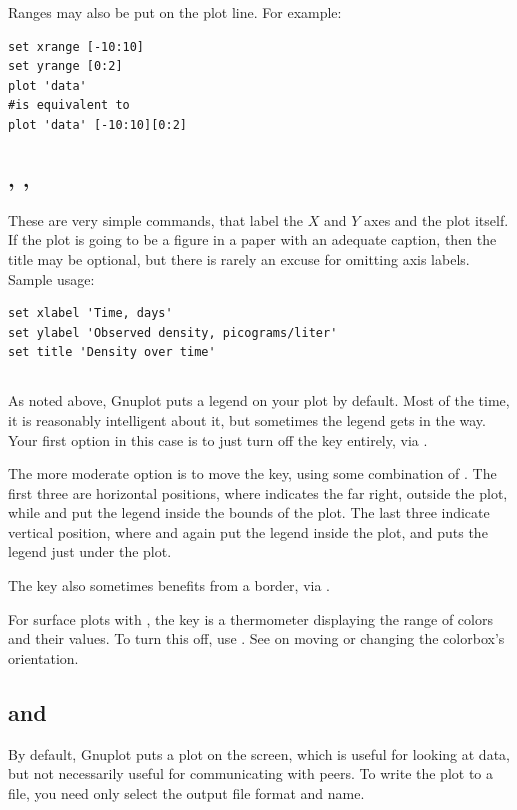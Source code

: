 Ranges may also be put on the plot line. For example:
\begin{lstlisting}
set xrange [-10:10]
set yrange [0:2]
plot 'data'
#is equivalent to
plot 'data' [-10:10][0:2]
\end{lstlisting}

\subsection{, , }
These are
very simple commands, that label the $X$
and $Y$ axes and the plot itself. If the plot is going to be a figure
in a paper with an adequate caption, then the title may be optional, but
there is rarely an excuse for omitting axis labels. Sample usage:
\begin{lstlisting}
set xlabel 'Time, days'
set ylabel 'Observed density, picograms/liter'
set title 'Density over time'
\end{lstlisting}

\subsection{}   As noted above, Gnuplot
puts a legend on your plot by default. Most of the time, it is
reasonably intelligent about it, but sometimes the legend gets in the
way. Your first option in this case is to just turn off the key
entirely, via .

The more moderate option is to move the key, using some combination of 
. The first three are
horizontal positions, where  indicates the far right,
outside the plot, while  and  put the
legend inside the bounds of the plot. The last three indicate vertical
position, where  and  again put the legend inside the
plot, and  puts the legend just under the plot.

The key also sometimes benefits from a border, via .

For surface plots with , the key is a thermometer displaying
the range of colors and their values. To turn this off, use . See  on moving or changing the
colorbox's orientation.

\subsection{ and } 
By default, Gnuplot puts a plot on the screen, which is useful for looking
at data, but not necessarily useful for communicating with peers. To write
the plot to a file, you need only select the output file format and name.

